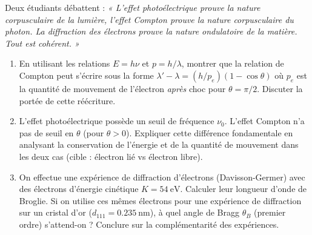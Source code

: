 \documentclass[11pt]{article}
\begin{document}
\begin{exercice}
Deux étudiants débattent : \textit{« L'effet photoélectrique prouve la nature corpusculaire de la lumière, l'effet Compton prouve la nature corpusculaire du photon. La diffraction des électrons prouve la nature ondulatoire de la matière. Tout est cohérent. »}
\begin{enumerate}
    \item En utilisant les relations $E = h\nu$ et $p = h/\lambda$, montrer que la relation de Compton peut s'écrire sous la forme $\lambda' - \lambda = (h/p_e)(1-\cos\theta)$ où $p_e$ est la quantité de mouvement de l'électron \textit{après} choc pour $\theta=\pi/2$. Discuter la portée de cette réécriture.
    \item L'effet photoélectrique possède un seuil de fréquence $\nu_0$. L'effet Compton n'a pas de seuil en $\theta$ (pour $\theta > 0$). Expliquer cette différence fondamentale en analysant la conservation de l'énergie et de la quantité de mouvement dans les deux cas (cible : électron lié vs électron libre).
    \item On effectue une expérience de diffraction d'électrons (Davisson-Germer) avec des électrons d'énergie cinétique $K = \SI{54}{\electronvolt}$. Calculer leur longueur d'onde de Broglie. Si on utilise ces mêmes électrons pour une expérience de diffraction sur un cristal d'or ($d_{111} = \SI{0,235}{\nano\metre}$), à quel angle de Bragg $\theta_B$ (premier ordre) s'attend-on ? Conclure sur la complémentarité des expériences.
\end{enumerate}
\end{exercice}
\end{document}
